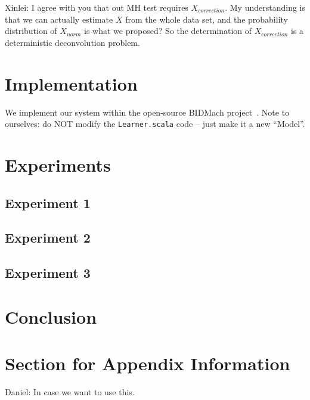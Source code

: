 \documentclass{article}
\begin{document}
{\color{blue} Xinlei: I agree with you that out MH test requires $X_{correction}$. My understanding
is that we can actually estimate $X$ from the whole data set, and the probability distribution of
$X_{norm}$ is what we proposed? So the determination of $X_{correction}$ is a deterministic
deconvolution problem.  }




\section{Implementation}\label{sec:implementation}

We implement our system within the open-source BIDMach project~\cite{canny2013bidmach}. Note to
ourselves: do NOT modify the \texttt{Learner.scala} code -- just make it a new ``Model''.




\section{Experiments}\label{sec:experiments}

\subsection{Experiment 1}

\subsection{Experiment 2}

\subsection{Experiment 3}



\section{Conclusion}\label{sec:conclusion}


\small



\clearpage
\appendix

\section{Section for Appendix Information}

{\color{blue}
Daniel: In case we want to use this.
}
\end{document}
